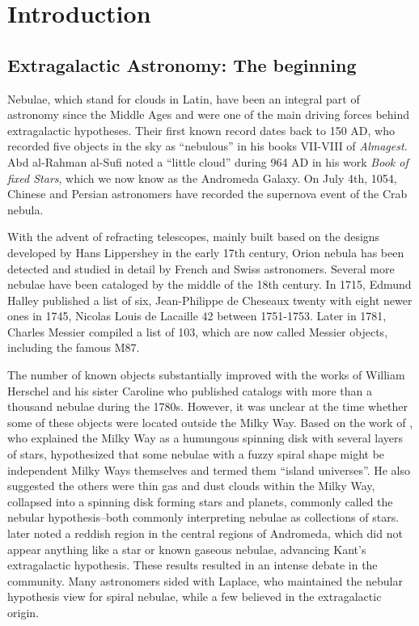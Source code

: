 
\renewcommand{\thechapter}{1}

\chapter{Introduction}

\section{Extragalactic Astronomy: The beginning}
Nebulae, which stand for clouds in Latin, have been an integral part of astronomy since the Middle Ages and were one of the main driving forces behind extragalactic hypotheses. Their first known record dates back to 150 AD, who recorded five objects in the sky as ``nebulous'' in his books VII-VIII  of \textit{Almagest}. Abd al-Rahman al-Sufi noted a ``little cloud'' during 964 AD in his work \textit{Book of fixed Stars}, which we now know as the Andromeda Galaxy. On July 4th, 1054, Chinese and Persian astronomers have recorded the supernova event of the Crab nebula.

With the advent of refracting telescopes, mainly built based on the designs developed by Hans Lippershey in the early 17th century, Orion nebula has been detected and studied in detail by French and Swiss astronomers. Several more nebulae have been cataloged by the middle of the 18th century. In 1715, Edmund Halley published a list of six, Jean-Philippe de Cheseaux twenty with eight newer ones in 1745, Nicolas Louis de Lacaille 42 between 1751-1753. Later in 1781, Charles Messier compiled a list of 103, which are now called Messier objects, including the famous M87.

The number of known objects substantially improved with the works of William Herschel and his sister Caroline who published catalogs with more than a thousand nebulae during the 1780s. However, it was unclear at the time whether some of these objects were located outside the Milky Way. Based on the work of \cite{wright1750original}, who explained the Milky Way as a humungous spinning disk with several layers of stars, \cite{kant1797allgemeine} hypothesized that some nebulae with a fuzzy spiral shape might be independent Milky Ways themselves and termed them ``island universes''. He also suggested the others were thin gas and dust clouds within the Milky Way, collapsed into a spinning disk forming stars and planets, commonly called the nebular hypothesis--both commonly interpreting nebulae as collections of stars.  \cite{10.2307/106755} later noted a reddish region in the central regions of Andromeda, which did not appear anything like a star or known gaseous nebulae, advancing Kant's extragalactic hypothesis. These results resulted in an intense debate in the community. Many astronomers sided with Laplace, who maintained the nebular hypothesis view for spiral nebulae, while a few believed in the extragalactic origin. 

